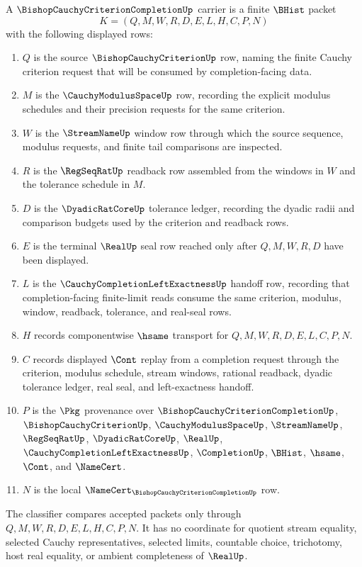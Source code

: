 \begin{definition}
\label{def:bishop-cauchy-criterion-completion-carrier}
A $\BishopCauchyCriterionCompletionUp$ carrier is a finite $\BHist$ packet
$$
K=(Q,M,W,R,D,E,L,H,C,P,N)
$$
with the following displayed rows:
\begin{enumerate}
\item $Q$ is the source $\BishopCauchyCriterionUp$ row, naming the finite Cauchy criterion request that will be consumed by completion-facing data.
\item $M$ is the $\CauchyModulusSpaceUp$ row, recording the explicit modulus schedules and their precision requests for the same criterion.
\item $W$ is the $\StreamNameUp$ window row through which the source sequence, modulus requests, and finite tail comparisons are inspected.
\item $R$ is the $\RegSeqRatUp$ readback row assembled from the windows in $W$ and the tolerance schedule in $M$.
\item $D$ is the $\DyadicRatCoreUp$ tolerance ledger, recording the dyadic radii and comparison budgets used by the criterion and readback rows.
\item $E$ is the terminal $\RealUp$ seal row reached only after $Q,M,W,R,D$ have been displayed.
\item $L$ is the $\CauchyCompletionLeftExactnessUp$ handoff row, recording that completion-facing finite-limit reads consume the same criterion, modulus, window, readback, tolerance, and real-seal rows.
\item $H$ records componentwise $\hsame$ transport for $Q,M,W,R,D,E,L,C,P,N$.
\item $C$ records displayed $\Cont$ replay from a completion request through the criterion, modulus schedule, stream windows, rational readback, dyadic tolerance ledger, real seal, and left-exactness handoff.
\item $P$ is the $\Pkg$ provenance over $\BishopCauchyCriterionCompletionUp$, $\BishopCauchyCriterionUp$, $\CauchyModulusSpaceUp$, $\StreamNameUp$, $\RegSeqRatUp$, $\DyadicRatCoreUp$, $\RealUp$, $\CauchyCompletionLeftExactnessUp$, $\CompletionUp$, $\BHist$, $\hsame$, $\Cont$, and $\NameCert$.
\item $N$ is the local $\NameCert_{\BishopCauchyCriterionCompletionUp}$ row.
\end{enumerate}
The classifier compares accepted packets only through $Q,M,W,R,D,E,L,H,C,P,N$. It has no coordinate for quotient stream equality, selected Cauchy representatives, selected limits, countable choice, trichotomy, host real equality, or ambient completeness of $\RealUp$.
\end{definition}

